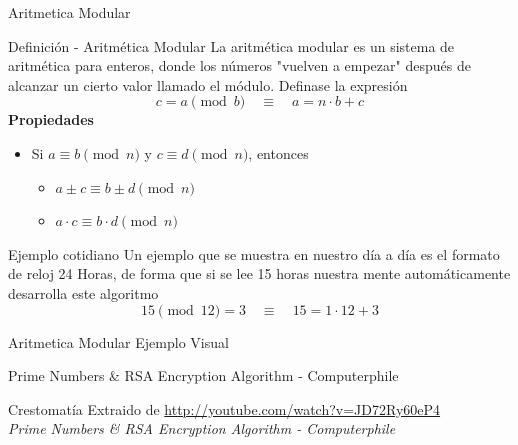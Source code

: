\documentclass[aspectratio=169]{beamer}
\begin{document}
\begin{frame}{Aritmetica Modular}
\begin{block}{Definición - Aritmética Modular}
    La aritmética modular es un sistema de aritmética para enteros, donde los números "vuelven a empezar" después de alcanzar un cierto valor llamado el módulo. 
    Definase la expresión
    $$c= a \pmod b \quad \equiv \quad a = n\cdot b + c$$
\textbf{Propiedades}
    \begin{itemize}
        \item Si $a \equiv b \pmod n$ y $c \equiv d \pmod n$, entonces 
        \begin{itemize}
            \item $a\pm c \equiv b\pm d \pmod n$
            \item $a\cdot c \equiv b\cdot d \pmod n$
        \end{itemize}
    \end{itemize}
\end{block}

\begin{exampleblock}{Ejemplo cotidiano}
    Un ejemplo que se muestra en nuestro día a día es el formato de reloj 24 Horas, de forma que si se lee 15 horas nuestra mente automáticamente desarrolla este algoritmo
    $$15  \pmod {12} =3 \quad \equiv \quad 15=1\cdot 12+3$$
\end{exampleblock}
    
\end{frame}

\begin{frame}{Aritmetica Modular Ejemplo Visual}
\begin{block}{Prime Numbers \& RSA Encryption Algorithm - Computerphile}
\centering
\vspace{2mm}
\noindent\makebox[\linewidth]{\rule{0pt}{3.8cm}} %
\vspace{2mm}
\end{block}
\begin{block}{Crestomatía}
    Extraido de \url{http://youtube.com/watch?v=JD72Ry60eP4} \\\textit{Prime Numbers \& RSA Encryption Algorithm - Computerphile}
\end{block}
    
\end{frame}
\end{document}
